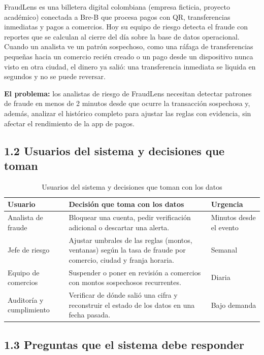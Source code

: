 \documentclass[12pt,letterpaper]{article}
\newcommand{\tablefont}{\small\setstretch{1.0}}
\begin{document}
FraudLens es una billetera digital colombiana (empresa ficticia, proyecto académico) conectada a Bre-B que procesa pagos con QR, transferencias inmediatas y pagos a comercios. Hoy su equipo de riesgo detecta el fraude con reportes que se calculan al cierre del día sobre la base de datos operacional. Cuando un analista ve un patrón sospechoso, como una ráfaga de transferencias pequeñas hacia un comercio recién creado o un pago desde un dispositivo nunca visto en otra ciudad, el dinero ya salió: una transferencia inmediata se liquida en segundos y no se puede reversar.

\textbf{El problema:} los analistas de riesgo de FraudLens necesitan detectar patrones de fraude en menos de 2 minutos desde que ocurre la transacción sospechosa y, además, analizar el histórico completo para ajustar las reglas con evidencia, sin afectar el rendimiento de la app de pagos.

\subsection*{1.2 Usuarios del sistema y decisiones que toman}

\begin{table}[H]
\caption{Usuarios del sistema y decisiones que toman con los datos}
\tablefont
\begin{tabular}{@{}P{1.4in}P{3.4in}P{1.55in}@{}}
\toprule
\textbf{Usuario} & \textbf{Decisión que toma con los datos} & \textbf{Urgencia}\\
\midrule
Analista de fraude & Bloquear una cuenta, pedir verificación adicional o descartar una alerta. & Minutos desde el evento\\
Jefe de riesgo & Ajustar umbrales de las reglas (montos, ventanas) según la tasa de fraude por comercio, ciudad y franja horaria. & Semanal\\
Equipo de comercios & Suspender o poner en revisión a comercios con montos sospechosos recurrentes. & Diaria\\
Auditoría y cumplimiento & Verificar de dónde salió una cifra y reconstruir el estado de los datos en una fecha pasada. & Bajo demanda\\
\bottomrule
\end{tabular}
\end{table}

\subsection*{1.3 Preguntas que el sistema debe responder}
\end{document}
